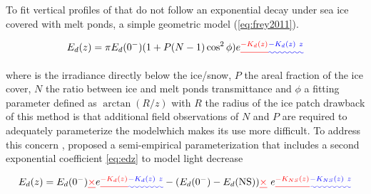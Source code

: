 To fit vertical profiles of \edz{} \DIFaddbegin {}\DIFaddend that do not follow an exponential decay under sea ice covered with melt ponds, \citet{Frey2011} \DIFdelbegin {}\DIFdelend \DIFaddbegin {}\DIFaddend a simple geometric model (\DIFdelbegin {}\DIFdelend \DIFaddbegin {}\DIFaddend \ref{eq:frey2011}). 

\begin{equation}
    \edz{} = \pi \edzero{} (1 + P(N-1)\cos^2\phi)e\DIFdelbegin \DIFdel{^{-\ked(z)}
    }\DIFdelend \DIFaddbegin \DIFadd{^{-\ked(z)~z}
    }\DIFaddend \label{eq:frey2011}
\end{equation}

\DIFaddbegin \noindent \DIFaddend where \edzero{} is the irradiance directly below the ice/snow, $P$ the areal fraction of the ice cover, $N$ the ratio between ice and melt ponds transmittance and $\phi$ a fitting parameter defined as $\arctan(R/z)$ with $R$ the radius of the ice patch \DIFdelbegin {}\DIFdelend \DIFaddbegin {}\DIFaddend drawback of this method is that additional field observations of $N$ and $P$ are required to adequately parameterize the model\DIFaddbegin \DIFadd{, }\DIFaddend which makes its use more difficult. To address this concern \DIFaddbegin {}\DIFaddend , \citet{Laney2017} proposed a semi-empirical parameterization that includes a second exponential coefficient \DIFdelbegin {}\DIFdelend \DIFaddbegin {}\DIFaddend \ref{eq:edz} to model light decrease \DIFdelbegin {}\DIFdelend \DIFaddbegin {}\DIFaddend 

\begin{equation}
    \edz{} = \edzero{}\DIFdelbegin \DIFdel{\times }\DIFdelend e\DIFdelbegin \DIFdel{^{-\ked(z)} }\DIFdelend \DIFaddbegin \DIFadd{^{-\ked(z)~z} }\DIFaddend - (\edzero{} - E_d(\text{NS}))\DIFdelbegin \DIFdel{\times }\DIFdelend \DIFaddbegin \DIFadd{~}\DIFaddend e\DIFdelbegin \DIFdel{^{-K_{NS}(z)}
    }\DIFdelend \DIFaddbegin \DIFadd{^{-K_{NS}(z)~z}
    }\DIFaddend \label{eq:laney2017}
\end{equation}

